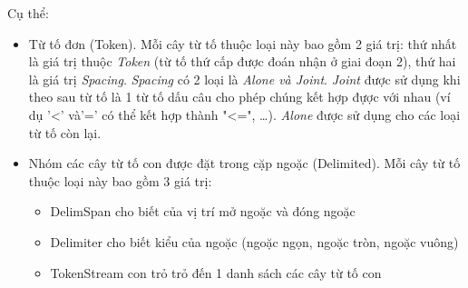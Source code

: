 Cụ thể:
\begin{itemize}
  \item Từ tố đơn (Token). Mỗi cây từ tố thuộc loại này bao gồm 2 giá trị: thứ nhất là giá trị thuộc \textit{Token} (từ tố thứ cấp được đoán nhận ở giai đoạn 2), thứ hai là giá trị \textit{Spacing}. \textit{Spacing} có 2 loại là \textit{Alone \emph{và} Joint}. \textit{Joint} được sử dụng khi theo sau từ tố là 1 từ tố dấu câu cho phép chúng kết hợp đựợc với nhau (ví dụ '<' và'=' có thể kết hợp thành "<=", \dots). \textit{Alone} được sử dụng cho các loại từ tố còn lại. 

  \item Nhóm các cây từ tố con được đặt trong cặp ngoặc (Delimited). Mỗi cây từ tố thuộc loại này bao gồm 3 giá trị:
  \begin{itemize}
    \item DelimSpan cho biết của vị trí mở ngoặc và đóng ngoặc
    \item Delimiter cho biết kiểu của ngoặc (ngoặc ngọn, ngoặc tròn, ngoặc vuông)
    \item TokenStream con trỏ trỏ đến 1 danh sách các cây từ tố con %
  \end{itemize}
\end{itemize}

